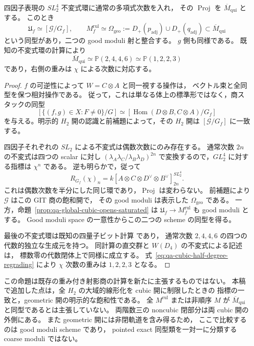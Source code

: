 \begin{proposition}[既存四量子ビット商との開部分比較]
\label{prop:qa-global-cubic-four-qubit-good-moduli}
四因子表現の $SL_2^4$ 不変式環に通常の多項式次数を入れ，
その $\operatorname{Proj}$ を $\overline M_{\mathrm{qui}}$ とする。
このとき
\[
 \mathfrak U_f\simeq[\mathscr G/G_f],
 \qquad
 M_f^{\mathrm{rul}}\simeq
 \Omega_{\mathrm{geo}}:=
       D_+(p_{\mathrm{adj}})\cup D_+(q_{\mathrm{adj}})
       \subset\overline M_{\mathrm{qui}}
\]
という同型があり，二つの good moduli 射と整合する。
$g$ 側も同様である。
既知の不変式環の計算により
\[
 \overline M_{\mathrm{qui}}\simeq\mathbb P(2,4,4,6)
                  \simeq\mathbb P(1,2,2,3)
\]
であり，右側の重みは $\chi$ による次数に対応する。
\end{proposition}
\begin{proof}
$f$ の可逆性によって $W=C\otimes A$ と同一視する操作は，
ベクトル束と全同型を保つ相対操作である。
従って，これは単なる体上の標準形ではなく，商スタックの同型
\[
 [\{(f,g)\in X:F\ne0\}/G]\simeq
 [\operatorname{Hom}(D\otimes B,C\otimes A)/G_f]
\]
を与える。明示的 $H_2$ 開の認識と前補題によって，その $H_2$ 開は
$[\mathscr G/G_f]$ に一致する。

四因子それぞれの $SL_2$ による不変式は偶数次数にのみ存在する。
通常次数 $2n$ の不変式は四つの scalar に対し
$(\lambda_A\lambda_C/\lambda_B\lambda_D)^{2n}$
で変換するので，$GL_2^4$ に対する指標は $\chi^n$ である。
逆も明らかで，従って
\[
 R_{G_f}(\chi)_n
   =k[A\otimes C\otimes D^\vee\otimes B^\vee]^{SL_2^4}_{2n}.
 \tag{CGIT}\label{eq:qa-cubic-half-degree-regrading}
\]
これは偶数次数を半分にした同じ環であり，$\operatorname{Proj}$ は変わらない。
前補題により $\mathscr G$ はこの GIT 商の飽和開で，
その good moduli は表示した $\Omega_{\mathrm{geo}}$ である。
一方，命題~\ref{prop:qa-global-cubic-opens-saturated} は
$\mathfrak U_f\to M_f^{\mathrm{rul}}$ も good moduli とする。
Good moduli space の一意性からこの二つの scheme の同型を得る。

最後の不変式環は既知の四量子ビット計算
\cite[\S3, (3.9)--(3.16), (3.19)]{OU2014} であり，
通常次数 $2,4,4,6$ の四つの代数的独立な生成元を持つ。
同計算の直交群と $W(D_4)$ の不変式による記述は，
標数零の代数閉体上で同様に成立する。
式~\eqref{eq:qa-cubic-half-degree-regrading} により
$\chi$ 次数の重みは $1,2,2,3$ となる。
\end{proof}

\begin{remark}[比較の範囲]
この命題は既存の重み付き射影商の計算を新たに主張するものではない。
本稿で追加した点は，全 $H_2$ の大域的線形化を cubic 開に制限したときの
指標の一致と，geometric 開の明示的な飽和性である。
全 $M^{\mathrm{rul}}$ または非順序 $M$ が
$\overline M_{\mathrm{qui}}$ と同型であるとは主張していない。
両階数三の noncubic 閉部分は両 cubic 開の外側にある。
また geometric 開には非閉軌道を含み得るため，
ここで比較するのは good moduli scheme であり，
pointed exact 同型類を一対一に分類する coarse moduli ではない。
\end{remark}
